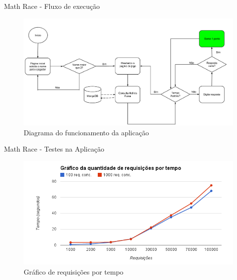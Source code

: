 \documentclass{beamer}
\newlength{\wideitemsep}
\let\olditem\item
\renewcommand{\item}{\setlength{\itemsep}{\wideitemsep}\olditem}
\begin{document}
\begin{frame}{Math Race - Fluxo de execução}
    \begin{figure}[htb]
    \centering
    \includegraphics[scale=0.2]{../images/func_mr_s9.png}
    \caption{Diagrama do funcionamento da aplicação}
    \label{fig: func_mr9}
    \end{figure}
\end{frame}


\begin{frame}{Math Race - Testes na Aplicação}
    \begin{figure}[htb]
    \centering
    \includegraphics[scale=0.5]{../images/reqxtempo.png}
    \caption{Gráfico de requisições por tempo}
    \label{fig: grad_rq_tmp}
    \end{figure}
\end{frame}
\end{document}
